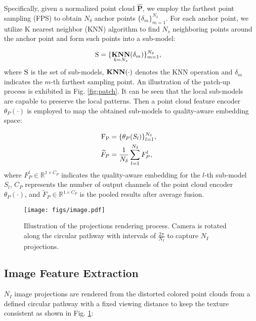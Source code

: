 \documentclass{article}
\begin{document}
Specifically, given a normalized point cloud $\mathbf{\hat{P}}$, we employ the farthest point sampling (FPS) to obtain $N_{\delta}$ anchor points $\{\delta_{m}\}_{m=1}^{N_{\delta}}$. For each anchor point, we utilize K nearest neighbor (KNN) algorithm to find $N_{s}$ neighboring points around the anchor point and form such points into a sub-model:

\begin{equation}
   {\rm S} = \{\mathop{\boldsymbol{\rm{KNN}}}\limits_{k=N_{s}}(\delta_{m})\}_{m=1}^{N_{\delta}},
\end{equation}
where $\rm{S}$ is the set of sub-models, $\boldsymbol{\rm{KNN}}(\cdot)$ denotes the KNN operation and $\delta_{m}$ indicates the $m$-th farthest sampling point. An illustration of the patch-up process is exhibited in Fig. \ref{fig:patch}. It can be seen that the local sub-models are capable to preserve the local patterns.
Then a point cloud feature encoder $\theta_{P}(\cdot)$ is employed to map the obtained sub-models to quality-aware embedding space:

\begin{equation}
\begin{aligned}
   \rm{F_{P}} &= \{\theta_{P}(S_{l})\}_{l=1}^{N_{\delta}}, \\
   \widetilde{F}_{P} &= \frac{1}{N_{\delta}}\sum_{l = 1}^{N_{\delta}}F_{P}^{l},
\end{aligned} 
\end{equation}
where $F_{P}^{l} \in \mathbb{R}^{1 \times C_{P}}$ indicates the quality-aware embedding for the $l$-th sub-model $S_{l}$, $C_{P}$ represents the number of output channels of the point cloud encoder $\theta_{P}(\cdot)$, and $\widetilde{F}_{P}  \in \mathbb{R}^{1 \times C_{P}}$ is the pooled results after average fusion.



\begin{figure}[!t]
    \centering
    \texttt{[image: figs/image.pdf]}
    \caption{Illustration of the projections rendering process. Camera is rotated along the circular pathway with intervals of $\frac{2\pi}{N_{I}}$ to capture $N_{I}$ projections. }
    \label{fig:image}
    \vspace{-0.175cm}
\end{figure}

\subsection{Image Feature Extraction}
\label{sec:image}
$N_{I}$ image projections are rendered from the distorted colored point clouds from a defined circular pathway with a fixed viewing distance to keep the texture consistent as shown in Fig. \ref{fig:image}:
\end{document}
